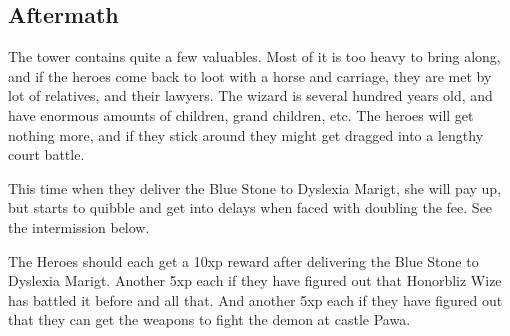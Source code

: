 \documentclass[11pt, twoside, titlepage, a4paper]{report}
\begin{document}
\subsection*{Aftermath}
The tower contains quite a few valuables. Most of it is too heavy to bring along, and if the heroes come back to loot with a horse and carriage, they are met by lot of relatives, and their lawyers. The wizard is several hundred years old, and have enormous amounts of children, grand children, etc. The heroes will get nothing more, and if they stick around they might get dragged into a lengthy court battle.

This time when they deliver the Blue Stone to Dyslexia Marigt, she will pay up, but starts to quibble and get into delays when faced with doubling the fee. See the intermission below.

The Heroes should each get a 10xp reward after delivering the Blue Stone to Dyslexia Marigt. Another 5xp each if they have figured out that Honorbliz Wize has battled it before and all that. And another 5xp each if they have figured out that they can get the weapons to fight the demon at castle Pawa.
\end{document}
